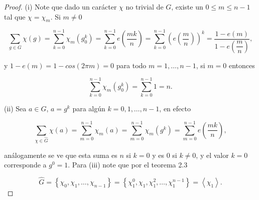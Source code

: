 \begin{proof}
(i) Note que dado un carácter $\chi$ no trivial de $G$, existe un $0\leq m\leq n-1$ tal que $\chi=\chi_m$. Si $m\neq 0$

$$\sum_{g \in G} \chi(g)=\sum_{k=0}^{n-1} \chi_m\left(g_0^k\right)=\sum_{k=0}^{n-1} e\left(\frac{m k}{n}\right)=\sum_{k=0}^{n-1}\left(e\left(\frac{m}{n}\right)\right)^k=\dfrac{1-e(m)}{1-e\left(\dfrac{m}{n}\right)},$$

y $1-e(m)=1-cos(2\pi m)=0$ para todo $m=1,\ldots,n-1$, si $m=0$ entonces

$$\sum_{k=0}^{n-1} \chi_m\left(g_0^k\right)=\sum_{k=0}^{n-1} 1=n.$$

(ii) Sea $a\in G$, $a=g^{k}$ para algún $k=0,1,\ldots,n-1$, en efecto

$$\sum_{\chi \in \widehat{G}} \chi(a)=\sum_{m=0}^{n-1} \chi_m(a)=\sum_{m=0}^{n-1} \chi_m\left(g^k\right)=\sum_{m=0}^{n-1} e\left(\frac{m k}{n}\right),$$

análogamente se ve que esta suma es $n$ si $k=0$ y es 0 si $k\neq 0$, y el valor $k=0$ corresponde a $g^{0}=1$. Para (iii) note que por el teorema 2.3

$$\widehat{G}=\left\{\chi_0, \chi_1, \ldots, \chi_{n-1}\right\}=\left\{\chi_1^0, \chi_1, \chi_1^2, \ldots, \chi_1^{n-1}\right\}=\left\langle\chi_1\right\rangle.$$

\end{proof}

$$$$